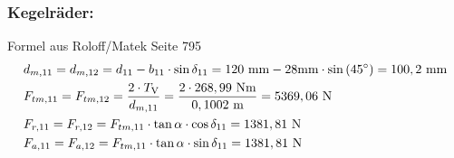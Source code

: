 \subsubsection {Kegelräder:}
Formel aus Roloff/Matek Seite 795 
\begin{align*}
	&d_{m,11} = d_{m,12}= d_{11} - b_{11} \cdot \sin{\delta_{11}} = 120 \text{ mm} - 28\text{mm} \cdot \sin{(45^\circ)} = 100,2 \text{ mm}\\ 
	&F_{tm,11} = F_{tm,12}= \frac{2 \cdot T_{\mathrm{V}}}{d_{m,11}} = \frac{2 \cdot 268,99 \text{ Nm} } {0,1002 \text{ m}} = 5369,06 \text{ N}\\
	&F_{r,11} = F_{r,12} = F_{tm,11} \cdot \tan{\alpha} \cdot \cos{\delta_{11}} =1381,81 \text{ N}\\ 
	&F_{a,11} = F_{a,12} =F_{tm,11}\cdot \tan{\alpha} \cdot \sin{\delta_{11}} = 1381,81 \text{ N} \\ 
\end{align*}